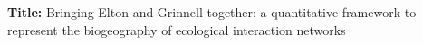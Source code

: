 \documentclass[12pt]{article}
\begin{document}
\linenumbers
\modulolinenumbers[1]

\textbf{Title:} Bringing Elton and Grinnell together: a quantitative framework
to represent the biogeography of ecological interaction networks\\


\end{document}
